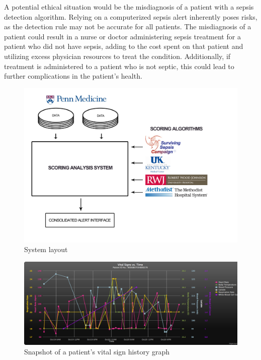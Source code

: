 \documentclass{sig-alternate}
\begin{document}
A potential ethical situation would be the misdiagnosis of a patient with a sepsis detection algorithm.  Relying on a computerized sepsis alert inherently poses risks, as the detection rule may not be accurate for all patients. The misdiagnosis of a patient could result in a nurse or doctor administering sepsis treatment for a patient who did not have sepsis, adding to the cost spent on that patient and utilizing excess physician resources to treat the condition. Additionally, if treatment is administered to a patient who is not septic, this could lead to further complications in the patient's health.  

\begin{figure}
	\begin{center}
		\includegraphics[width=1.0\linewidth]{FlowChart.png}
	\end{center}
	\caption{System layout}
	\label{fig:layout}
\end{figure}



\begin{figure}
	\begin{center}
		\includegraphics[width=1.0\linewidth]{patientGraph.png}
	\end{center}
	\caption{Snapshot of a patient's vital sign history graph}
	\label{fig:patient_graph}
\end{figure}
\end{document}
